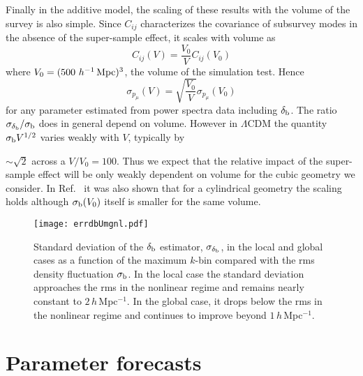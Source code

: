 \documentclass[prd,twocolumn,amsmath,amssymb,floatfix,superscriptaddress]{revtex4-1}
\newcommand{\mtrv}[1]{{\textcolor{red}{#1}}}
\newcommand{\br}{{\rm b}}
\newcommand{\hMpci}{$h\,$Mpc$^{-1}$}
\begin{document}
{Finally in the additive model, the scaling of these results with the volume of the survey 
is also simple.   Since $C_{ij}$ characterizes the covariance of subsurvey modes
in the absence of the super-sample effect, it scales with volume as
\begin{equation}
C_{ij}(V) = \frac{V_0}{V} C_{ij} (V_0)
\label{eq:CijV}
\end{equation}
where $V_0 = (500~h^{-1}\, {\rm Mpc})^3$, the volume of the simulation test.  Hence
\begin{equation}
\sigma_{p_{\mu}}(V) =\sqrt{ \frac{V_0}{V} } \sigma_{p_\mu} (V_0)
\label{eq:sigmaV}
\end{equation}
for any parameter estimated from power spectra data including $\delta_\br$.
The ratio $\sigma_{\delta_\br}/\sigma_\br$ does in general depend on volume.   However
in $\Lambda$CDM the quantity $\sigma_\br V^{1/2}$ varies weakly with $V$, typically by
{$\sim \sqrt{2}$ across a $V/V_0=100$.
  Thus we expect that the
relative impact of the super-sample  effect will be only weakly
dependent on volume for the cubic geometry we consider.   
{In Ref.~\cite{Takada:2013wfa} it was also shown that for a cylindrical geometry
the scaling holds although $\sigma_\br(V_0)$ itself is smaller for the same volume.}






\begin{figure}[tb]
    \centering
    \texttt{[image: errdbUmgnl.pdf]}
    \caption{
        \footnotesize Standard deviation of the $\delta_\br$
 estimator, 
$\sigma_{\delta_\br}$, in the local and global cases as a function of the
        maximum $k$-bin compared with %
the rms density fluctuation
$\sigma_\br$.  In the local
        case the standard deviation approaches the rms in the nonlinear regime and remains
        nearly constant to $2\,$\hMpci.  In the global case, it drops below the rms in the
        nonlinear regime and continues to improve beyond $1\,$\hMpci.
    }
    \label{fig:errdbUmgnl}
\end{figure}





\section{Parameter forecasts}
\label{sec:degen}

}}
\end{document}
